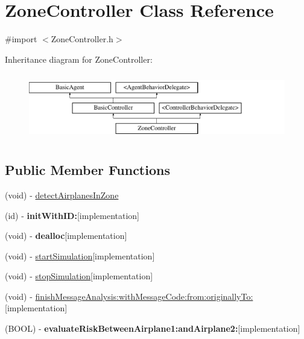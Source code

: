 \hypertarget{class_zone_controller}{
\section{\-Zone\-Controller \-Class \-Reference}
\label{class_zone_controller}
}


{\ttfamily \#import $<$\-Zone\-Controller.\-h$>$}

\-Inheritance diagram for \-Zone\-Controller\-:\begin{figure}[H]
\begin{center}
\leavevmode
\includegraphics[height=2.931937cm]{class_zone_controller}
\end{center}
\end{figure}
\subsection*{\-Public \-Member \-Functions}
\begin{DoxyCompactItemize}
\item 
(void) -\/ \hyperlink{class_zone_controller_a077014b47ef9c0be714e1d27af527441}{detect\-Airplanes\-In\-Zone}
\item 
\hypertarget{class_zone_controller_a3b8fc62c0b3442bc9a4a67f1eabdeeac}{
(id) -\/ {\bfseries init\-With\-I\-D\-:}{\ttfamily  \mbox{[}implementation\mbox{]}}}
\label{class_zone_controller_a3b8fc62c0b3442bc9a4a67f1eabdeeac}

\item 
\hypertarget{class_zone_controller_af05aeffa738f4b1cdd761dab69cbd475}{
(void) -\/ {\bfseries dealloc}{\ttfamily  \mbox{[}implementation\mbox{]}}}
\label{class_zone_controller_af05aeffa738f4b1cdd761dab69cbd475}

\item 
(void) -\/ \hyperlink{class_zone_controller_a06708c84f0edc0169eb5688af2995477}{start\-Simulation}{\ttfamily  \mbox{[}implementation\mbox{]}}
\item 
(void) -\/ \hyperlink{class_zone_controller_ae7f6a5d43d659e35c0acc11ea7cc894a}{stop\-Simulation}{\ttfamily  \mbox{[}implementation\mbox{]}}
\item 
(void) -\/ \hyperlink{class_zone_controller_aaee71e51737c671990bd2c5594344fba}{finish\-Message\-Analysis\-:with\-Message\-Code\-:from\-:originally\-To\-:}{\ttfamily  \mbox{[}implementation\mbox{]}}
\item 
\hypertarget{class_zone_controller_a1c9723834624a1a788f37da19bf95bfa}{
(\-B\-O\-O\-L) -\/ {\bfseries evaluate\-Risk\-Between\-Airplane1\-:and\-Airplane2\-:}{\ttfamily  \mbox{[}implementation\mbox{]}}}
\label{class_zone_controller_a1c9723834624a1a788f37da19bf95bfa}

\end{DoxyCompactItemize}

